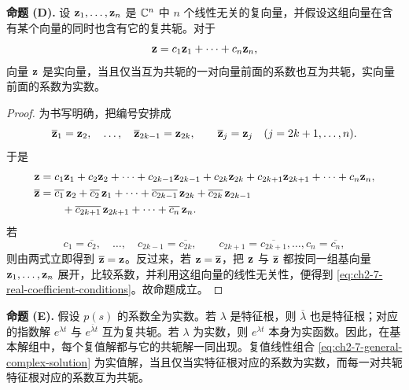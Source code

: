 \medskip
\noindent\textbf{命题 (D).}
设 \(\vect{z}_1,\ldots,\vect{z}_n\) 是 \(\mathbb C^n\) 中 \(n\) 个线性无关的复向量，并假设这组向量在含有某个向量的同时也含有它的复共轭。对于
\begin{equation}
 \vect{z}=c_1\vect{z}_1+\cdots+c_n\vect{z}_n,
 \label{eq:ch2-7-complex-linear-combination}
\end{equation}
向量 \(\vect{z}\) 是实向量，当且仅当互为共轭的一对向量前面的系数也互为共轭，实向量前面的系数为实数。

\begin{proof}
为书写明确，把编号安排成
\[
 \overline{\vect{z}}_1=\vect{z}_2,\quad\ldots,\quad
 \overline{\vect{z}}_{2k-1}=\vect{z}_{2k},
 \qquad
 \overline{\vect{z}}_j=\vect{z}_j\quad(j=2k+1,\ldots,n).
\]
于是
\begin{align}
 \vect{z}&=c_1\vect{z}_1+c_2\vect{z}_2+\cdots+c_{2k-1}\vect{z}_{2k-1}
   +c_{2k}\vect{z}_{2k}
   +c_{2k+1}\vect{z}_{2k+1}+\cdots+c_n\vect{z}_n,\notag\\
 \overline{\vect{z}}
 &=\overline{c_1}\,\vect{z}_2+\overline{c_2}\,\vect{z}_1+\cdots
   +\overline{c_{2k-1}}\,\vect{z}_{2k}
   +\overline{c_{2k}}\,\vect{z}_{2k-1}\notag\\
 &\qquad+\overline{c_{2k+1}}\,\vect{z}_{2k+1}+\cdots
   +\overline{c_n}\,\vect{z}_n.
 \label{eq:ch2-7-conjugate-combination}
\end{align}
若
\begin{equation}
 c_1=\overline{c_2},\quad\ldots,\quad
 c_{2k-1}=\overline{c_{2k}},
 \qquad
 c_{2k+1}=\overline{c_{2k+1}},\ldots,
 c_n=\overline{c_n},
 \label{eq:ch2-7-real-coefficient-conditions}
\end{equation}
则由两式立即得到 \(\overline{\vect{z}}=\vect{z}\)。反过来，若 \(\vect{z}=\overline{\vect{z}}\)，把 \(\vect{z}\) 与 \(\overline{\vect{z}}\) 都按同一组基向量 \(\vect{z}_1,\ldots,\vect{z}_n\) 展开，比较系数，并利用这组向量的线性无关性，便得到 \eqref{eq:ch2-7-real-coefficient-conditions}。故命题成立。
\end{proof}

\medskip
\noindent\textbf{命题 (E).}
假设 \(p(s)\) 的系数全为实数。若 \(\lambda\) 是特征根，则 \(\overline\lambda\) 也是特征根；对应的指数解 \(e^{\lambda t}\) 与 \(e^{\overline\lambda t}\) 互为复共轭。若 \(\lambda\) 为实数，则 \(e^{\lambda t}\) 本身为实函数。因此，在基本解组中，每个复值解都与它的共轭解一同出现。复值线性组合 \eqref{eq:ch2-7-general-complex-solution} 为实值解，当且仅当实特征根对应的系数为实数，而每一对共轭特征根对应的系数互为共轭。

